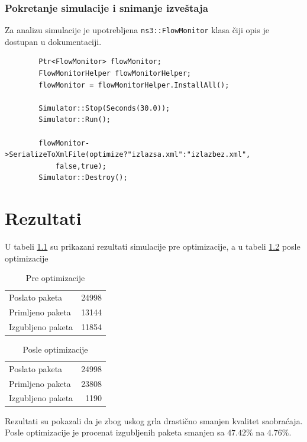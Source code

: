 \documentclass[a4paper, 12pt, projekat]{etf}
\begin{document}
	\subsection{Pokretanje simulacije i snimanje izveštaja}
	Za analizu simulacije je upotrebljena \verb|ns3::FlowMonitor| klasa čiji opis je dostupan u dokumentaciji.\cite{ns3doc}
	\begin{verbatim}
		Ptr<FlowMonitor> flowMonitor;
		FlowMonitorHelper flowMonitorHelper;
		flowMonitor = flowMonitorHelper.InstallAll();
		
		Simulator::Stop(Seconds(30.0));
		Simulator::Run();
		
		flowMonitor->SerializeToXmlFile(optimize?"izlazsa.xml":"izlazbez.xml",
		    false,true);
		Simulator::Destroy();
	\end{verbatim}
	
	
	\chapter{Rezultati}
	U tabeli \ref{tab:pakpre} su prikazani rezultati simulacije pre optimizacije, a u tabeli \ref{tab:pakposle} posle optimizacije
	\begin{table}[htb]
		\centering
		\caption{Pre optimizacije}
		\label{tab:pakpre}
		\medskip
		\begin{tabular}{l|r}
			\hline
			Poslato paketa & 24998 \\
			Primljeno paketa & 13144 \\
			Izgubljeno paketa & 11854 \\
		\end{tabular}
	\end{table}
	\begin{table}[htb]
		\centering
		\caption{Posle optimizacije}
		\label{tab:pakposle}
		\medskip
		\begin{tabular}{l|r}
			\hline
			Poslato paketa & 24998 \\
			Primljeno paketa & 23808 \\
			Izgubljeno paketa & 1190 
		\end{tabular}
	\end{table}
	Rezultati su pokazali da je zbog uskog grla drastično smanjen kvalitet saobraćaja. Posle optimizacije je procenat izgubljenih paketa smanjen sa $47.42\%$ na $4.76\%$.
	
\end{document}
